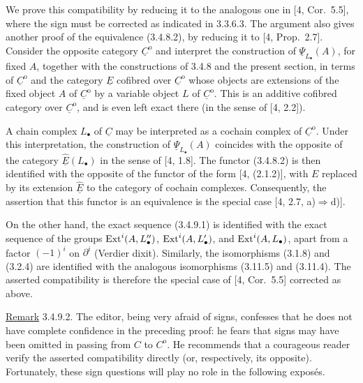 We prove this compatibility by reducing it to the analogous one in
[4, Cor.~5.5], where the sign must be corrected as indicated in
3.3.6.3.  The argument also gives another proof of the equivalence
(3.4.8.2), by reducing it to [4, Prop.~2.7].  Consider the opposite
category $\underline C^{\mathrm o}$ and interpret the construction
of $\underline\Psi_{L_\bullet}(A)$, for fixed $A$, together with
the constructions of 3.4.8 and the present section, in terms of
$\underline C^{\mathrm o}$ and the category $\underline E$ cofibred
over $\underline C^{\mathrm o}$ whose objects are extensions of the
fixed object $A$ of $\underline C^{\mathrm o}$ by a variable object
$L$ of $\underline C^{\mathrm o}$.  This is an additive cofibred
category over $\underline C^{\mathrm o}$, and is even left exact
there (in the sense of [4, 2.2]).

A chain complex $L_\bullet$ of $\underline C$ may be interpreted as
a cochain complex of $\underline C^{\mathrm o}$.  Under this
interpretation, the construction of $\underline\Psi_{L_\bullet}(A)$
coincides with the opposite of the category
$\underline{\widehat E}(L_\bullet)$ in the sense of [4, 1.8].  The
functor (3.4.8.2) is then identified with the opposite of the functor
of the form [4, (2.1.2)], with $E$ replaced by its extension
$\underline{\widehat E}$ to the category of cochain complexes.
Consequently, the assertion that this functor is an equivalence is
the special case [4, 2.7, a)$\Rightarrow$d)].

On the other hand, the exact sequence (3.4.9.1) is identified with
the exact sequence of the groups $\operatorname{Ext}^i(A,L''_\bullet)$,
$\operatorname{Ext}^i(A,L'_\bullet)$, and $\operatorname{Ext}^i(A,L_\bullet)$, apart from a
factor $(-1)^i$ on $\partial^i$ (Verdier dixit).  Similarly, the
isomorphisms (3.1.8) and (3.2.4) are identified with the analogous
isomorphisms (3.11.5) and (3.11.4).  The asserted compatibility is
therefore the special case of [4, Cor.~5.5] corrected as above.

\underline{Remark} 3.4.9.2. The editor, being very afraid of signs,
confesses that he does not have complete confidence in the preceding
proof: he fears that signs may have been omitted in passing from
$C$ to $C^{\mathrm o}$.  He recommends that a courageous reader
verify the asserted compatibility directly (or, respectively, its
opposite).  Fortunately, these sign questions will play no role in
the following expos\'es.
